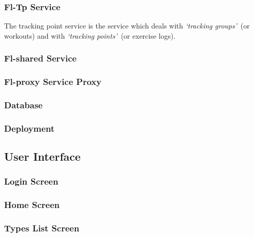 \documentclass{article}
\newcommand{\vspaceconst}{-2ex}
\newcommand{\tps}{\textit{`tracking points'}}
\newcommand{\tgs}{\textit{`tracking groups'}}
\begin{document}
\begin{multicols}{2}
\subsubsection{Fl-Tp Service}
\vspace{\vspaceconst}

The tracking point service is the service which deals with \tgs~(or workouts) and with \tps~(or exercise logs).


\subsubsection{Fl-shared Service}
\vspace{\vspaceconst}

\subsubsection{Fl-proxy Service Proxy}
\vspace{\vspaceconst}

\subsubsection{Database}
\vspace{\vspaceconst}

\subsubsection{Deployment}
\vspace{\vspaceconst}

\subsection{User Interface}
\vspace{\vspaceconst}

\subsubsection{Login Screen}
\vspace{\vspaceconst}

\subsubsection{Home Screen}
\vspace{\vspaceconst}

\subsubsection{Types List Screen}
\vspace{\vspaceconst}


\end{multicols}
\end{document}
